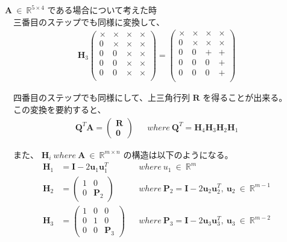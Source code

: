 \documentclass[dvipdfmx,10pt,presentation]{beamer}
\begin{document}
\begin{frame}[allowframebreaks]{\(\bm{A}\ \in\ \mathbb{R}^{5\times4}\) である場合について考えた時}
\framebreak\\
　三番目のステップでも同様に変換して、\\

\begin{align*}
\bm{H}_3
\begin{pmatrix}
\times & \times & \times & \times \\
0 & \times & \times & \times \\
0 & 0 & \times & \times \\
0 & 0 & \times & \times \\
0 & 0 & \times & \times \\
\end{pmatrix}
=
\begin{pmatrix}
\times & \times & \times & \times \\
0 & \times & \times & \times \\
0 & 0 & + & + \\
0 & 0 & 0 & + \\
0 & 0 & 0 & + \\
\end{pmatrix}
\end{align*}

　四番目のステップでも同様にして、上三角行列 \(\bm{R}\) を得ることが出来る。\\
　この変換を要約すると、\\

\begin{align*}
\bm{Q}^T\bm{A}=
\begin{pmatrix}
\bm{R} \\
\bm{0}
\end{pmatrix}
&& where\ \bm{Q}^T =\bm{H}_4\bm{H}_3\bm{H}_2\bm{H}_1
\end{align*}

　また、 \(\bm{H}_i\ where\ \bm{A}\ \in\ \mathbb{R}^{m\times n}\) の構造は以下のようになる。\\

\begin{align}
\bm{H}_1 &= \bm{I} - 2\bm{u}_1\bm{u}_1^T && where\ u_1\ \in\ \mathbb{R}^m \nonumber \\
\bm{H}_2 &= 
\begin{pmatrix}
1 & 0 \\
0 & \bm{P}_2
\end{pmatrix}
&& where\ \bm{P}_2=\bm{I} - 2\bm{u}_2\bm{u}_2^T,\ \bm{u}_2\ \in\ \mathbb{R}^{m-1}
\nonumber \\ 
\bm{H}_3 &= 
\begin{pmatrix}
1 & 0 & 0 \\
0 & 1 & 0 \\
0 & 0 & \bm{P}_3 
\end{pmatrix}
&& where\ \bm{P}_3=\bm{I} - 2\bm{u}_3\bm{u}_3^T,\ \bm{u}_3\ \in\ \mathbb{R}^{m-2}
\tag{5.1}
\end{align}




\end{frame}
\end{document}
